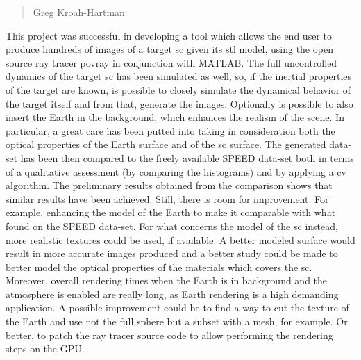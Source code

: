 \begin{quotation}
  {\footnotesize
    \begin{flushright}
      Greg Kroah-Hartman
    \end{flushright}
  }
\end{quotation}
\vspace{0.5cm}

This project was successful in developing a tool which allows the end user to produce hundreds of images of a target \acrshort{sc} given its \acrshort{stl} model, using the open source ray tracer \acrshort{povray} in conjunction with MATLAB. The full uncontrolled dynamics of the target \acrshort{sc} has been simulated as well, so, if the inertial properties of the target are known, is possible to closely simulate the dynamical behavior of the target itself and from that, generate the images. Optionally is possible to also insert the Earth in the background, which enhances the realism of the scene. In particular, a great care has been putted into taking in consideration both the optical properties of the Earth surface and of the \acrshort{sc} surface.
The generated data-set has been then compared to the freely available SPEED data-set both in terms of a qualitative assessment (by comparing the histograms) and by applying a \acrshort{cv} algorithm.
The preliminary results obtained from the comparison shows that similar results have been achieved.
Still, there is room for improvement. For example, enhancing the model of the Earth to make it comparable with what found on the SPEED data-set. For what concerns the model of the \acrshort{sc} instead, more realistic textures could be used, if available. A better modeled surface would result in more accurate images produced and a better study could be made to better model the optical properties of the materials which covers the \acrshort{sc}. Moreover, overall rendering times when the Earth is in background and the atmosphere is enabled are really long, as Earth rendering is a high demanding application. A possible improvement could be to find a way to cut the texture of the Earth and use not the full sphere but a subset with a mesh, for example. Or better, to patch the ray tracer source code to allow performing the rendering steps on the GPU.
